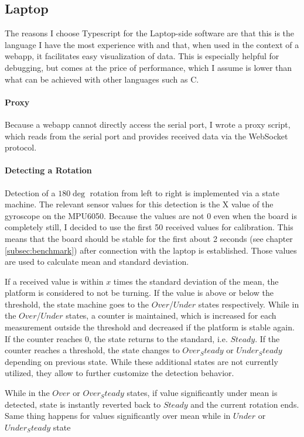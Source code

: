 \subsection{Laptop}
\label{subsec:laptop}

The reasons I choose Typescript for the Laptop-side software are that this is the language I have the most experience with and that, when used in the context of a webapp, it facilitates easy visualization of data.
This is especially helpful for debugging, but comes at the price of performance, which I assume is lower than what can be achieved with other languages such as C.

\paragraph{Proxy}
Because a webapp cannot directly access the serial port, I wrote a proxy script, which reads from the serial port and provides received data via the WebSocket protocol.

\paragraph{Detecting a Rotation}
Detection of a $180\deg$ rotation from left to right is implemented via a state machine.
The relevant sensor values for this detection is the X value of the gyroscope on the MPU6050.
Because the values are not 0 even when the board is completely still, I decided to use the first 50 received values for calibration.
This means that the board should be stable for the first about 2 seconds (see chapter \ref{subsec:benchmark}) after connection with the laptop is established.
Those values are used to calculate mean and standard deviation.

If a received value is within $x$ times the standard deviation of the mean, the platform is considered to not be turning.
If the value is above or below the threshold, the state machine goes to the $Over$/$Under$ states respectively.
While in the $Over$/$Under$ states, a counter is maintained, which is increased for each measurement outside the threshold and decreased if the platform is stable again.
If the counter reaches 0, the state returns to the standard, i.e. $Steady$. If the counter reaches a threshold, the state changes to $Over_Steady$ or $Under_Steady$ depending on previous state.
While these additional states are not currently utilized, they allow to further customize the detection behavior.

While in the $Over$ or $Over_Steady$ states, if value significantly under mean is detected, state is instantly reverted back to $Steady$ and the current rotation ends. Same thing happens for values significantly over mean while in $Under$ or $Under_Steady$ state

